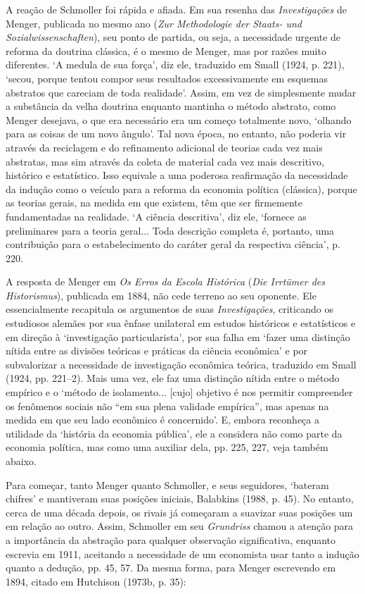 \documentclass[12pt]{article}
\begin{document}
A reação de Schmoller foi rápida e afiada. Em sua resenha das \textit{Investigações} de Menger, publicada no mesmo ano (\textit{Zur Methodologie der Staats- und Sozialwissenschaften}), seu ponto de partida, ou seja, a necessidade urgente de reforma da doutrina clássica, é o mesmo de Menger, mas por razões muito diferentes. ‘A medula de sua força’, diz ele, traduzido em Small (1924, p. 221), ‘secou, porque tentou compor seus resultados excessivamente em esquemas abstratos que careciam de toda realidade’. Assim, em vez de simplesmente mudar a substância da velha doutrina enquanto mantinha o método abstrato, como Menger desejava, o que era necessário era um começo totalmente novo, ‘olhando para as coisas de um novo ângulo’. Tal nova época, no entanto, não poderia vir através da reciclagem e do refinamento adicional de teorias cada vez mais abstratas, mas sim através da coleta de material cada vez mais descritivo, histórico e estatístico. Isso equivale a uma poderosa reafirmação da necessidade da indução como o veículo para a reforma da economia política (clássica), porque as teorias gerais, na medida em que existem, têm que ser firmemente fundamentadas na realidade. ‘A ciência descritiva’, diz ele, ‘fornece as preliminares para a teoria geral... Toda descrição completa é, portanto, uma contribuição para o estabelecimento do caráter geral da respectiva ciência’, p. 220.

A resposta de Menger em \textit{Os Erros da Escola Histórica} (\textit{Die Irrtümer des Historismus}), publicada em 1884, não cede terreno ao seu oponente. Ele essencialmente recapitula os argumentos de suas \textit{Investigações}, criticando os estudiosos alemães por sua ênfase unilateral em estudos históricos e estatísticos e em direção à ‘investigação particularista’, por sua falha em ‘fazer uma distinção nítida entre as divisões teóricas e práticas da ciência econômica’ e por subvalorizar a necessidade de investigação econômica teórica, traduzido em Small (1924, pp. 221–2). Mais uma vez, ele faz uma distinção nítida entre o método empírico e o ‘método de isolamento... [cujo] objetivo é nos permitir compreender os fenômenos sociais não “em sua plena validade empírica”, mas apenas na medida em que seu lado econômico é concernido’. E, embora reconheça a utilidade da ‘história da economia pública’, ele a considera não como parte da economia política, mas como uma auxiliar dela, pp. 225, 227, veja também abaixo.

Para começar, tanto Menger quanto Schmoller, e seus seguidores, ‘bateram chifres’ e mantiveram suas posições iniciais, Balabkins (1988, p. 45). No entanto, cerca de uma década depois, os rivais já começaram a suavizar suas posições um em relação ao outro. Assim, Schmoller em seu \textit{Grundriss} chamou a atenção para a importância da abstração para qualquer observação significativa, enquanto escrevia em 1911, aceitando a necessidade de um economista usar tanto a indução quanto a dedução, pp. 45, 57. Da mesma forma, para Menger escrevendo em 1894, citado em Hutchison (1973b, p. 35):
\end{document}

